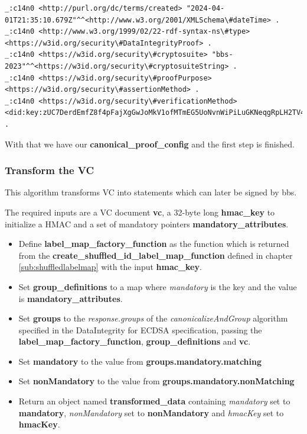 \documentclass[
	a4paper               %
	,bibliography=totoc   %
	,listof=totoc         %
	,monolingual
	twoside=false,
]{bfhthesis}              %
\begin{document}
\begin{lstlisting}[language=canon,firstnumber=1,caption={Example Proof Config canonicalized},captionpos=b]
_:c14n0 <http://purl.org/dc/terms/created> "2024-04-01T21:35:10.679Z"^^<http://www.w3.org/2001/XMLSchema\#dateTime> .
_:c14n0 <http://www.w3.org/1999/02/22-rdf-syntax-ns\#type> <https://w3id.org/security\#DataIntegrityProof> .
_:c14n0 <https://w3id.org/security\#cryptosuite> "bbs-2023"^^<https://w3id.org/security\#cryptosuiteString> .
_:c14n0 <https://w3id.org/security\#proofPurpose> <https://w3id.org/security\#assertionMethod> .
_:c14n0 <https://w3id.org/security\#verificationMethod> <did:key:zUC7DerdEmfZ8f4pFajXgGwJoMkV1ofMTmEG5UoNvnWiPiLuGKNeqgRpLH2TV4Xe5mJ2cXV76gRN7LFQwapF1VFu6x2yrr5ci1mXqC1WNUrnHnLgvfZfMH7h6xP6qsf9EKRQrPQ\#zUC7DerdEmfZ8f4pFajXgGwJoMkV1ofMTmEG5UoNvnWiPiLuGKNeqgRpLH2TV4Xe5mJ2cXV76gRN7LFQwapF1VFu6x2yrr5ci1mXqC1WNUrnHnLgvfZfMH7h6xP6qsf9EKRQrPQ> .
\end{lstlisting}

With that we have our \textbf{canonical\_proof\_config} and the first step is finished.

\subsubsection{Transform the VC}
\label{chap:transform}
This algorithm transforms VC into statements which can later be signed by bbs.

The required inputs are a VC document \textbf{vc}, a 32-byte long \textbf{hmac\_key} to initialize a HMAC and a set of mandatory pointers \textbf{mandatory\_attributes}.

\begin{itemize}
	\item Define \textbf{label\_map\_factory\_function} as the function which is returned from the \textbf{create\_shuffled\_id\_label\_map\_function} defined in chapter \ref{sub:shuffledlabelmap} with the input \textbf{hmac\_key}.
	\item Set \textbf{group\_definitions} to a map where \textit{mandatory} is the key and the value is \textbf{mandatory\_attributes}.
	\item Set \textbf{groups} to the \textit{response.groups} of the \textit{canonicalizeAndGroup} algorithm specified in the DataIntegrity for ECDSA specification\cite{ecdsa}, passing the \textbf{label\_map\_factory\_function}, \textbf{group\_definitions} and \textbf{vc}.
	\item Set \textbf{mandatory} to the value from \textbf{groups.mandatory.matching}
	\item Set \textbf{nonMandatory} to the value from \textbf{groups.mandatory.nonMatching}
	\item Return an object named \textbf{transformed\_data} containing \textit{mandatory} set to \textbf{mandatory}, \textit{nonMandatory} set to \textbf{nonMandatory} and \textit{hmacKey} set to \textbf{hmacKey}.
\end{itemize}
\end{document}
